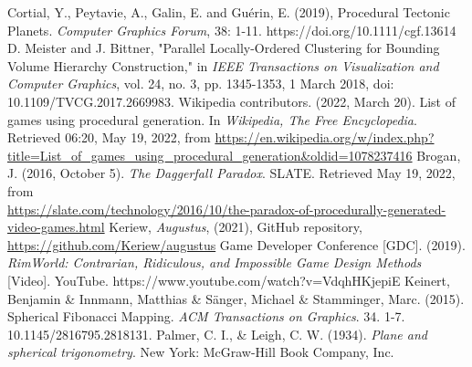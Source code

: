 \begin{thebibliography}{9}
Cortial, Y., Peytavie, A., Galin, E. and Guérin, E. (2019), Procedural Tectonic Planets. \textit{Computer Graphics Forum}, 38: 1-11. https://doi.org/10.1111/cgf.13614
D. Meister and J. Bittner, "Parallel Locally-Ordered Clustering for Bounding Volume Hierarchy Construction," in \textit{IEEE Transactions on Visualization and Computer Graphics}, vol. 24, no. 3, pp. 1345-1353, 1 March 2018, doi: 10.1109/TVCG.2017.2669983.
Wikipedia contributors. (2022, March 20). List of games using procedural generation. In \textit{Wikipedia, The Free Encyclopedia}. Retrieved 06:20, May 19, 2022, from \url{https://en.wikipedia.org/w/index.php?title=List\_of\_games\_using\_procedural\_generation\&oldid=1078237416}
Brogan, J. (2016, October 5). \textit{The Daggerfall Paradox}. SLATE. Retrieved May 19, 2022, from\\ \url{https://slate.com/technology/2016/10/the-paradox-of-procedurally-generated-video-games.html}
Keriew, \textit{Augustus}, (2021), GitHub repository, \url{https://github.com/Keriew/augustus}
Game Developer Conference [GDC]. (2019). \textit{RimWorld: Contrarian, Ridiculous, and Impossible Game Design Methods} [Video]. YouTube. https://www.youtube.com/watch?v=VdqhHKjepiE
Keinert, Benjamin  \& Innmann, Matthias \& Sänger, Michael \& Stamminger, Marc. (2015). Spherical Fibonacci Mapping. \textit{ACM Transactions on Graphics}. 34. 1-7. 10.1145/2816795.2818131. 
Palmer, C. I., \& Leigh, C. W. (1934). \textit{Plane and spherical trigonometry}. New York: McGraw-Hill Book Company, Inc. 
\end{thebibliography}